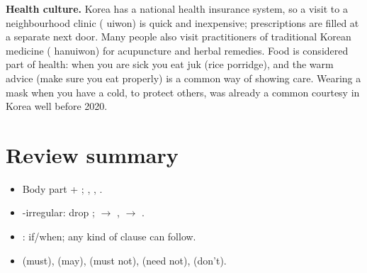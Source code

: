 \begin{aside}
\textbf{Health culture.} Korea has a national health insurance system, so a visit to a
neighbourhood clinic ( uiwon) is quick and inexpensive; prescriptions are filled
at a separate  next door. Many people also visit practitioners of traditional
Korean medicine ( hanuiwon) for acupuncture and herbal remedies. Food is
considered part of health: when you are sick you eat  juk (rice porridge), and
the warm advice  (make sure you eat properly) is a common way of
showing care. Wearing a mask when you have a cold, to protect others, was already a
common courtesy in Korea well before 2020.
\end{aside}

\section*{Review summary}
\begin{itemize}
  \item Body part + ; , ,
        .
  \item {}-irregular: drop ;  $\to$ , 
        $\to$ .
  \item {}: if/when; any kind of clause can follow.
  \item {} (must),  (may),
         (must not),  (need not),
         (don't).
\end{itemize}
